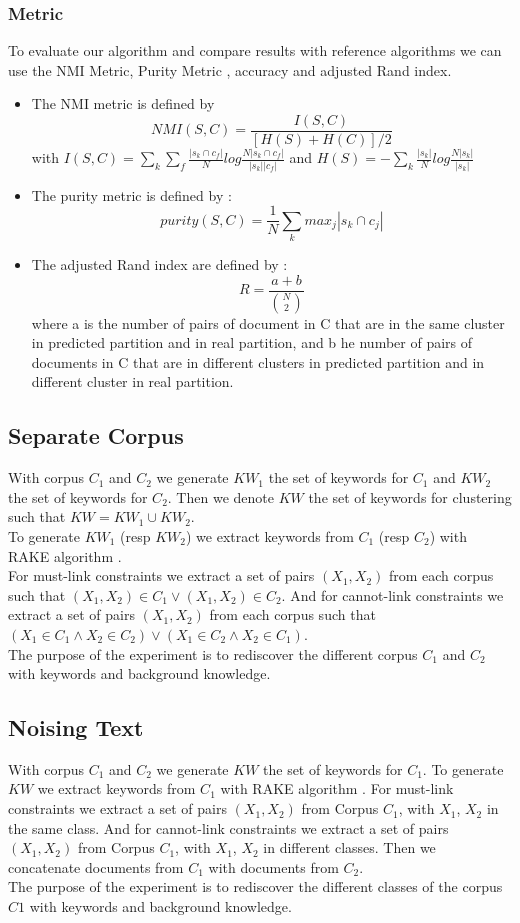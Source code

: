 \subsubsection{Metric}
To evaluate our algorithm and compare results with reference algorithms we can
use the NMI Metric, Purity Metric \cite{measure}, accuracy and adjusted
Rand index. 
\begin{itemize}
\item The NMI metric is defined by
$$
NMI(S,C) = \frac{I(S,C)}{[H(S)+H(C)]/2}
$$ 
with
$
I(S,C) =\sum_k \sum_f\frac{|s_k \cap c_f|}{N}log\frac{N|s_k \cap c_f|}{|s_k| |c_f|}
$ and $
H(S) = -\sum_k\frac{|s_k|}{N}log\frac{N|s_k|}{|s_k|}
$
\item The purity metric is defined by :
$$
purity(S,C) = \frac{1}{N}\sum_k {max}_j|s_k \cap c_j|
$$
\item The adjusted Rand index are defined by :
  $$R = \frac{a+b}{\binom{N}{2}}$$
  where a is the number of pairs of document in C
  that are in the same cluster in predicted partition and in real
  partition, and b he number of pairs of documents in C that are in
  different clusters in predicted partition and in different cluster
  in real partition.
\end{itemize}
\subsection{Separate Corpus }
With corpus $C_1$ and $C_2$ we generate $KW_1$ the set of keywords
for $C_1$ and $KW_2$ the set of keywords for $C_2$. Then we denote $KW$
the set of keywords for clustering such that $KW = KW_1 \cup KW_2$.\\
To generate $KW_1$ (resp $KW_2$) we extract keywords from $C_1$ (resp $C_2$)
with RAKE algorithm \cite{rake}.\\
For must-link constraints we extract a set of pairs $(X_1, X_2)$ from each
corpus such that $(X_1, X_2) \in C_1 \vee (X_1, X_2) \in C_2$.
And for cannot-link constraints we extract a set of pairs $(X_1, X_2)$ from
each corpus such that $(X_1 \in C_1 \wedge  X_2 \in C_2)\vee (X_1 \in C_2 \wedge
X_2 \in C_1)$.\\
The purpose of the experiment is to rediscover the different corpus $C_1$ and
$C_2$ with keywords and background knowledge.
\subsection{Noising Text}
With corpus $C_1$ and $C_2$ we generate $KW$ the set of keywords
for $C_1$.
To generate $KW$ we extract keywords from $C_1$ with RAKE algorithm \cite{rake}.
For must-link constraints we extract a set of pairs $(X_1, X_2)$ from Corpus
$C_1$, with $X_1$, $X_2$ in the same class.
And for cannot-link constraints we extract a set of pairs $(X_1, X_2)$ from Corpus
$C_1$, with $X_1$, $X_2$ in different classes.
Then we concatenate documents from $C_1$ with documents from $C_2$.\\
The purpose of the experiment is to rediscover the different classes of the
corpus $C1$ with keywords and background knowledge.
